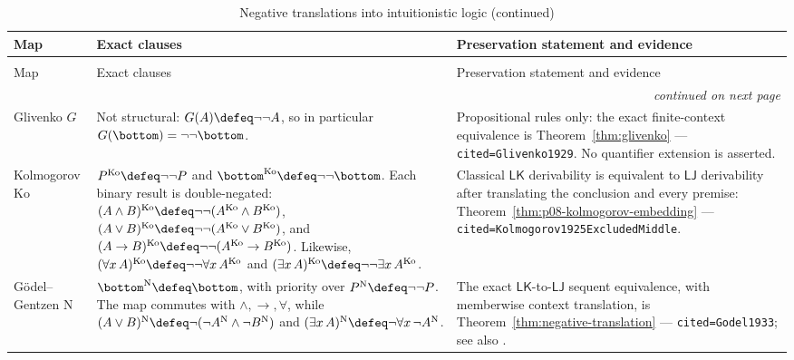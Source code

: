 \begin{landscape}
\begingroup\scriptsize\setlength{\tabcolsep}{3pt}
\begin{longtable}{@{}p{.75in}p{3.60in}p{2.85in}@{}}
\caption{Negative translations into intuitionistic logic.}
\label{tab:p08-negative-translations}\\
\toprule
Map & Exact clauses & Preservation statement and evidence \\
\midrule
\endfirsthead
\caption[]{Negative translations into intuitionistic logic (continued)}\\
\toprule
Map & Exact clauses & Preservation statement and evidence \\
\midrule
\endhead
\midrule\multicolumn{3}{r}{\emph{continued on next page}}\\
\endfoot
\endlastfoot
Glivenko \(G\) &
Not structural: \(G(A)\defeq\neg\neg A\), so in particular
\(G(\bottom)=\neg\neg\bottom\). &
Propositional rules only: the exact finite-context equivalence is
Theorem~\ref{thm:glivenko} --- \texttt{cited=Glivenko1929}.  No
quantifier extension is asserted. \\
\addlinespace
Kolmogorov \(\mathrm{Ko}\) &
\(P^{\mathrm{Ko}}\defeq\neg\neg P\) and
\(\bottom^{\mathrm{Ko}}\defeq\neg\neg\bottom\).  Each binary result is
double-negated:
\((A\land B)^{\mathrm{Ko}}\defeq
\neg\neg(A^{\mathrm{Ko}}\land B^{\mathrm{Ko}})\),
\((A\lor B)^{\mathrm{Ko}}\defeq
\neg\neg(A^{\mathrm{Ko}}\lor B^{\mathrm{Ko}})\), and
\((A\to B)^{\mathrm{Ko}}\defeq
\neg\neg(A^{\mathrm{Ko}}\to B^{\mathrm{Ko}})\).  Likewise,
\((\forall x\,A)^{\mathrm{Ko}}\defeq
\neg\neg\forall x\,A^{\mathrm{Ko}}\) and
\((\exists x\,A)^{\mathrm{Ko}}\defeq
\neg\neg\exists x\,A^{\mathrm{Ko}}\). &
Classical \(\mathsf{LK}\) derivability is equivalent to
\(\mathsf{LJ}\) derivability after translating the conclusion and every
premise: Theorem~\ref{thm:p08-kolmogorov-embedding} ---
\texttt{cited=Kolmogorov1925ExcludedMiddle}. \\
\addlinespace
G\"odel--Gentzen \(\mathrm N\) &
\(\bottom^{\mathrm N}\defeq\bottom\), with priority over
\(P^{\mathrm N}\defeq\neg\neg P\).  The map commutes with
\(\land,\to,\forall\), while
\((A\lor B)^{\mathrm N}\defeq
\neg(\neg A^{\mathrm N}\land\neg B^{\mathrm N})\) and
\((\exists x\,A)^{\mathrm N}\defeq
\neg\forall x\,\neg A^{\mathrm N}\). &
The exact \(\mathsf{LK}\)-to-\(\mathsf{LJ}\) sequent equivalence, with
memberwise context translation, is Theorem~\ref{thm:negative-translation} ---
\texttt{cited=Godel1933}; see also \cite{Gentzen1936}. \\

\end{longtable}
\end{landscape}
